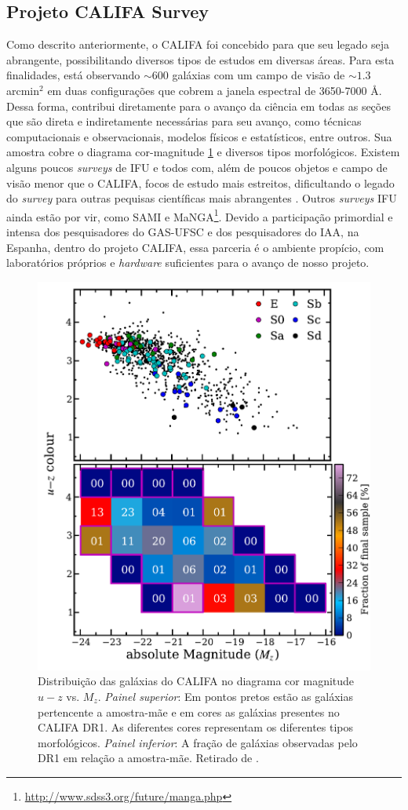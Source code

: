 \documentclass[a4paper,12pt]{article}
\begin{document}
\subsection{Projeto CALIFA Survey}
Como descrito anteriormente, o CALIFA foi concebido para que seu legado seja abrangente, possibilitando diversos tipos de estudos em diversas áreas.
Para esta finalidades, está observando $\sim 600$ galáxias com um campo de visão de $\sim1.3$ arcmin$^2$ em duas configurações que cobrem a janela
espectral de 3650-7000 \AA. Dessa forma, contribui diretamente para o avanço da ciência em todas as seções que são direta e indiretamente necessárias
para seu avanço, como técnicas computacionais e observacionais, modelos físicos e estatísticos, entre outros. Sua amostra cobre o diagrama
cor-magnitude \ref{fig:cm-uzMz} e diversos tipos morfológicos. Existem alguns poucos {\em surveys} de IFU e todos com, além de poucos objetos e campo
de visão menor que o CALIFA, focos de estudo mais estreitos, dificultando o legado do {\em survey} para outras pequisas científicas mais abrangentes
\citep[SAURON;][região central de 72 galáxias com $z < 0.01$.]{de-Zeeuw2002} \citep[PINGS;][algumas galáxias muito próximas ($\sim 10$ Mpc) e o estudo
atual de 70 (U)LIRGs com $z <0.26$]{RosalesOrtega2010} \citep[VENGA;][$30$ galáxias espirais]{Blanc2010} \citep[ATLAS\textsuperscript{3D};][260
galáxias {\em early-type} próximas]{Cappellari2011}. Outros {\em surveys} IFU ainda estão por vir, como SAMI \citep{Croom2012} e
MaNGA\footnote{\url{http://www.sdss3.org/future/manga.php}}. Devido a participação primordial e intensa dos pesquisadores do GAS-UFSC e dos
pesquisadores do IAA, na Espanha, dentro do projeto CALIFA, essa parceria é o ambiente propício, com laboratórios próprios e {\em hardware}
suficientes para o avanço de nosso projeto.

\begin{figure}
	\begin{center}
    \includegraphics[height=0.5\textwidth]{figuras/figHusemann2013Fig2.pdf}
    \caption[Diagrama cor-magnitude para as galáxias do CALIFA.]
    {Distribui\c{c}\~ao das galáxias do CALIFA no diagrama cor magnitude $u-z$ vs. $M_z$. {\em Painel superior}: Em
    pontos pretos est\~ao as galáxias pertencente a amostra-m\~ae e em cores as galáxias presentes no CALIFA DR1. As
    diferentes cores representam os diferentes tipos morfológicos. {\em Painel inferior}: A fra\c{c}\~ao de galáxias
    observadas pelo DR1 em rela\c{c}\~ao a amostra-m\~ae. Retirado de \citet{Husemann2013}.}
    \label{fig:cm-uzMz}
    \end{center}
\end{figure}
\end{document}
